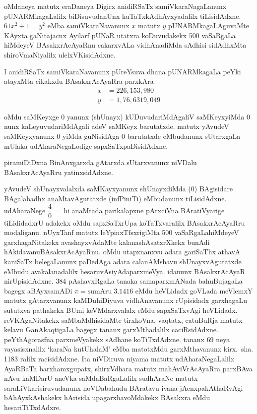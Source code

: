 oMdaneya matutx eraDaneya Digirx anidiRSaTx samiVkaraNagaLanunx pUNARMkagaLalilx biDisuvudanUnx kuTaTxkAdhAyxyadalilx tiLisidAdxne. $61 x^{2}+1=y^{2}$ eMba samiVkaraNavanunx $x$ matutx $y$ pUNARMkagaLAguvaMte KAyxta gaNitajacnx Ayilarf pUNaR utatxra koDuvudakekx {\rm 500} vaSaRgaLa hiMdeyeV BAsakxrAcAyaRnu cakarxvALa vidhAnadiMda sAdhisi sidAdhxMta shiroVmaNiyalilx ulelxVKisidAdxne.

I anidiRSaTx samiVkaraNavanunx pUreYsuva dhana pUNARMkagaLa peYki atayxMta cikakxdu BAsakxrAcAyaRra parxkAra 
\begin{align*}
x&=226, 153, 980\\ 
y&=1, 76, 6 319, 049
\end{align*}

oMdu saMKeyxge {\rm 0} yanunx (shUnayx) kUDuvudariMdAgaliV saMKeyxyiMda {\rm 0} nunx kaLeyuvudariMdAgali adeV saMKeyx barutatxde. matutx yAvudeV saMKeyxyanunx {\rm 0} yiMda guNisidAga {\rm 0} barutatxde eMbudanunx sUtarxgaLa mUlaka udAharaNegaLodige sapxSaTxpaDisi\-dAdxne.

piramiDiDxna BinAnxgarxda gAtarxda sUtarxvanunx niVDalu BAsakxrAcAyaRru yatinxsi\-dAdxne.

yAvudeV shUnayxvalalxda saMKayxyanunx shUnayxdiMda {\rm (0)} BAgisidare BAgalabadhx anaMta\-vAgutatxde (infPiniTi) eMbudanunx tiLisidAdxne. udAharaNege $\dfrac{4}{0}=$ hi \-anaMtada parikalapxne pArxciVna BAratiVyarige tiLididadxrU adakekx oMdu sapxSaTxrUpa koTaTxva\-ralilx BAsakxrAcAyaRru modaliganu. nUyxTanf matutx leYpinxTfsxrigiMta {\rm 500} vaSaRgaLa\break hiMdeyeV garxhagaNitakekx avashayxvAdaMte kalanashAsatxrXkekx bunAdi hAkidavanu\break BAsakxrAcAyaRnu. oMdu utapxnanxvu adara gariSaThx athavA kaniSaTx belegaLanunx paDedAga adara calanAMshavu shUnayxvAgutatxde eMbudu avakalanadalilx hesaruvAsiyAda\break parxmeVya. idanunx BAsakxrAcAyaR nirUpisidAdxne. {\rm 384} pAshavxRgaLa tanaka sama\break parxmANada bahuBujagaLa bagegx aBAyxsamADi $\pi= \text{sumAru}\; 3.1416$ eMdu heVLidadx goVLada meVlemxY matutx gAtarxvanunx kaMDuhiDiyuva vidhAnavanunx rUpisidadx garxhagaLu sututxva pathakekx BUmi keVMdarxvalalx eMdu sapxSaTxvAgi heVLidadx. reVKAgaNitakekx saMbaMdhi\-sidaMte tirxkoVna, vaqtatx, catuBuRja matutx kelavu GanAkaqtigaLa bagegx tananx garxMthadalilx caciRsidAdxne. peYthAgorasfna parxmeVyakekx sAdhane koTiTxdAdxne. tananx {\rm 69} neya vayasisx\-nalilx `karaNa kutU\-halaM' eMba matotxMdu garxMthavanunx kirx.~sha. {\rm 1183} ralilx racisidAdxne. Ita niVDiruva niyama matutx udAharaNegaLalilx AyaRBaTa barxhamxgupatx, shirxVdhara matutx mahA\-viVrAcAyaRra parxBAva nAvu kaMDarU aneVka saMdaBaRgaLalilx sudhAraNe matutx saraLiV\-karisiruvudanunx noVDabahudu BAratavu ivana jAcnxpakAthaRvAgi bAhAyxkAshakekx hAri\-sida upagarxhavoMdakekx BAsakxra eMdu hesariTiTxdAdxre.

